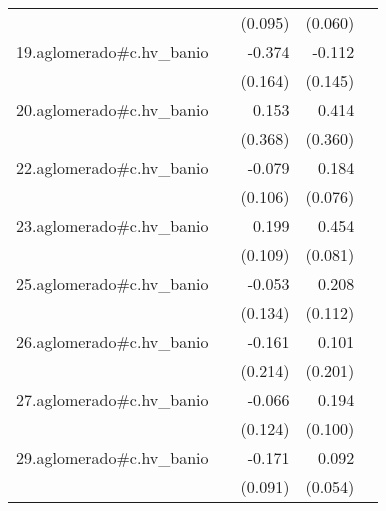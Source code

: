 {\begin{longtable}{l*{4}{D{.}{.}{-1}}}
            &                     &     (0.095)         &     (0.060)         &                     \\
\addlinespace
19.aglomerado#c.hv\_banio&                     &      -0.374\sym{*}  &      -0.112         &                     \\
            &                     &     (0.164)         &     (0.145)         &                     \\
\addlinespace
20.aglomerado#c.hv\_banio&                     &       0.153         &       0.414         &                     \\
            &                     &     (0.368)         &     (0.360)         &                     \\
\addlinespace
22.aglomerado#c.hv\_banio&                     &      -0.079         &       0.184\sym{*}  &                     \\
            &                     &     (0.106)         &     (0.076)         &                     \\
\addlinespace
23.aglomerado#c.hv\_banio&                     &       0.199         &       0.454\sym{***}&                     \\
            &                     &     (0.109)         &     (0.081)         &                     \\
\addlinespace
25.aglomerado#c.hv\_banio&                     &      -0.053         &       0.208         &                     \\
            &                     &     (0.134)         &     (0.112)         &                     \\
\addlinespace
26.aglomerado#c.hv\_banio&                     &      -0.161         &       0.101         &                     \\
            &                     &     (0.214)         &     (0.201)         &                     \\
\addlinespace
27.aglomerado#c.hv\_banio&                     &      -0.066         &       0.194         &                     \\
            &                     &     (0.124)         &     (0.100)         &                     \\
\addlinespace
29.aglomerado#c.hv\_banio&                     &      -0.171         &       0.092         &                     \\
            &                     &     (0.091)         &     (0.054)         &                     \\

\end{longtable}}
